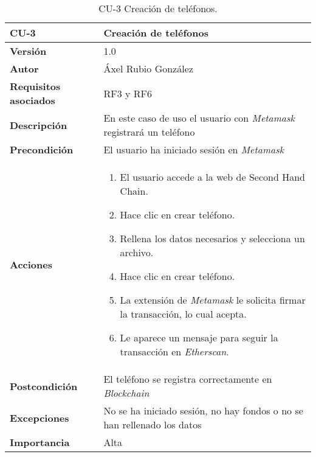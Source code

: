 \begin{table}[p]
	\centering
	\begin{tabularx}{\linewidth}{ p{} p{} }
		\toprule
		\textbf{CU-3}    & \textbf{Creación de teléfonos}\\
		\toprule
		\textbf{Versión}              & 1.0    \\
		\textbf{Autor}                & Áxel Rubio González \\
		\textbf{Requisitos asociados} & RF3 y RF6 \\
		\textbf{Descripción}          & En este caso de uso el usuario con \textit{Metamask} registrará un teléfono  \\
		\textbf{Precondición}         & El usuario ha iniciado sesión en \textit{Metamask} \\
		\textbf{Acciones}             &
		\begin{enumerate}
			\def\labelenumi{\arabic{enumi}.}
			\tightlist
			\item El usuario accede a la web de Second Hand Chain.
			\item Hace clic en crear teléfono.
                \item Rellena los datos necesarios y selecciona un archivo.
                \item Hace clic en crear teléfono.
                \item La extensión de \textit{Metamask} le solicita firmar la transacción, lo cual acepta.
                \item Le aparece un mensaje para seguir la transacción en \textit{Etherscan}.
		\end{enumerate}\\
		\textbf{Postcondición}        & El teléfono se registra correctamente en \textit{Blockchain} \\
		\textbf{Excepciones}          & No se ha iniciado sesión, no hay fondos o no se han rellenado los datos \\
		\textbf{Importancia}          & Alta \\
		\bottomrule
	\end{tabularx}
	\caption{CU-3 Creación de teléfonos.}
\end{table}

